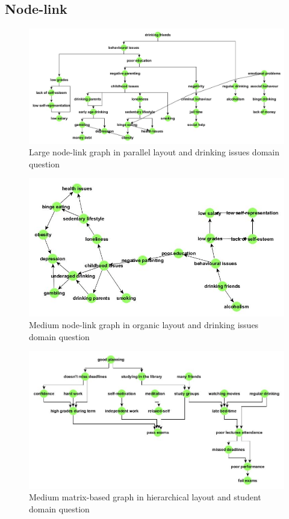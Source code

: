 \documentclass{l4proj}
\begin{document}
\begin{appendices}
\section{Node-link}

\begin{figure}
\centering
\includegraphics[width=20cm]{images/drinkingIssuesLargeParallel.jpg}
\caption{Large node-link graph in parallel layout and drinking issues domain question}
\label{drinkingIssuesLargeParallel}
\end{figure}

\begin{figure}[H]
\centering
\includegraphics[width=15cm]{images/drinkingIssuesMedOrganic.jpg}
\caption{Medium node-link graph in organic layout and drinking issues domain question}
\label{drinkingIssuesMedOrganic}
\end{figure}


\begin{figure}
\centering
\includegraphics[width=18cm]{images/studentMedHier.jpg}
\caption{Medium matrix-based graph in hierarchical layout and student domain question}
\label{studentMedHier}
\end{figure}



\end{appendices}
\end{document}
